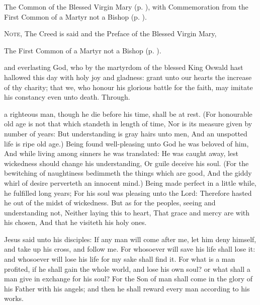 
\begin{rubric}
	The Common of the Blessed Virgin Mary (p. \pageref{CommonBVM}), with Commemoration  from the First Common of a Martyr not a Bishop (p. \pageref{CommonMartyrNotBishopI}).
\end{rubric}

\begin{rubric}
	\textsc{Note,} The Creed is said and the Preface of the Blessed Virgin Mary, 
\end{rubric}


\clearpage
{}

\begin{rubric}
	The First Common of a Martyr not a Bishop (p. \pageref{CommonMartyrNotBishopI}).
\end{rubric}

\collect
{} and everlasting God, who by the martyrdom of the blessed King Oswald hast hallowed this day with holy joy and gladness: grant unto our hearts the increase of thy charity; that we, who honour his glorious battle for the faith, may imitate his constancy even unto death. Through.

 a righteous man, though he die before his time, shall be at rest. (For honourable old age is not that which standeth in length of time, Nor is its measure given by number of years: But understanding is gray hairs unto men, And an unspotted life is ripe old age.) Being found well-pleasing unto God he was beloved of him, And while living among sinners he was translated: He was caught away, lest wickedness should change his understanding, Or guile deceive his soul. (For the bewitching of naughtiness bedimmeth the things which are good, And the giddy whirl of desire perverteth an innocent mind.) Being made perfect in a little while, he fulfilled long years; For his soul was pleasing unto the Lord: Therefore hasted he out of the midst of wickedness. But as for the peoples, seeing and understanding not, Neither laying this to heart, That grace and mercy are with his chosen, And that he visiteth his holy ones.

 Jesus said unto his disciples: If any man will come after me, let him deny himself, and take up his cross, and follow me. For whosoever will save his life shall lose it: and whosoever will lose his life for my sake shall find it. For what is a man profited, if he shall gain the whole world, and lose his own soul? or what shall a man give in exchange for his soul? For the Son of man shall come in the glory of his Father with his angels; and then he shall reward every man according to his works.


